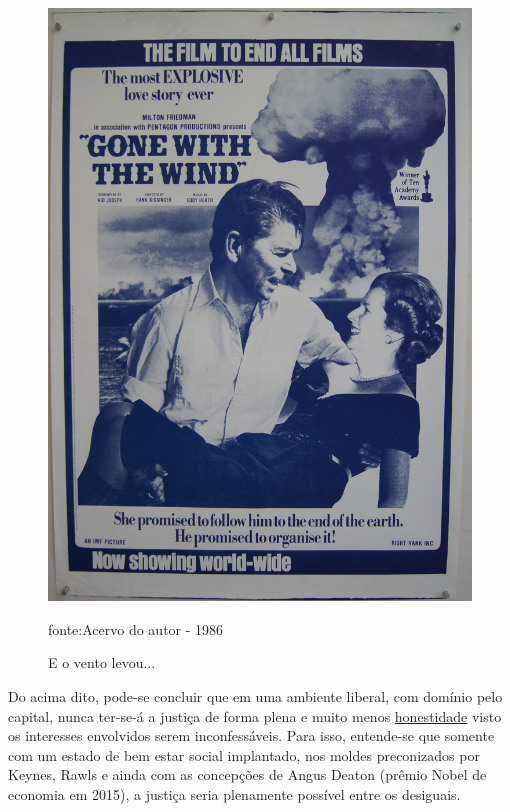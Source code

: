 \documentclass[
	12pt,				%
	openright,			%
	twoside,			%
	a4paper,			%
	chapter=TITLE,		%
	section=TITLE,		%
	subsection=TITLE,	%
	subsubsection=TITLE,%
	spanish,            %
	english,			%
	brazil				%
	]{abntex2}
\begin{document}
\begin{figure}[!htpb]
	\caption{\label{Figuraa}E o vento levou...}
	\begin{center}
		\includegraphics[scale=0.14]{ventolevou.jpg}
	\end{center}
	\ABNTEXchapterfont\small{fonte:Acervo do autor - 1986}
\end{figure}
\FloatBarrier
\par
Do acima dito, pode-se concluir que em uma ambiente liberal, com domínio pelo capital, nunca ter-se-á a justiça de forma plena e muito menos \href{http://www.bbc.com/portuguese/noticias/2015/09/150923_vw_escandalo_cc}{honestidade} visto os interesses envolvidos serem inconfessáveis. Para isso, entende-se que somente com um estado de bem estar social implantado, nos moldes preconizados por Keynes, Rawls e ainda com as concepções de Angus Deaton (prêmio Nobel de economia em 2015), a justiça seria plenamente possível entre os desiguais. 
\end{document}
